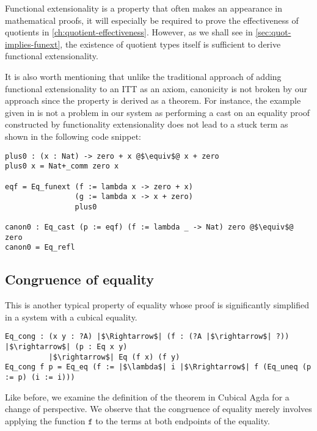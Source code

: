 \documentclass[12pt,twoside,maitrise]{dms}
\theoremstyle{definition}
\numberwithin{equation}{section}
\numberwithin{table}{chapter}
\numberwithin{figure}{chapter}
\newcommand\id[1] {\texttt{#1}}
\begin{document}
Functional extensionality is a property that often makes an appearance in
mathematical proofs, it will especially be required to prove the effectiveness
of quotients in \autoref{ch:quotient-effectiveness}. However, as we shall see in
\autoref{sec:quot-implies-funext}, the existence of quotient types itself is
sufficient to derive functional extensionality.

It is also worth mentioning that unlike the traditional approach of adding
functional extensionality to an ITT as an axiom, canonicity is not broken by our
approach since the property is derived as a theorem. For instance, the example
given in\cite{altenkirch2007observational} is not a problem in our system as
performing a cast on an equality proof constructed by functionality
extensionality does not lead to a stuck term as shown in the following code snippet:

\begin{verbatim}
plus0 : (x : Nat) -> zero + x @$\equiv$@ x + zero
plus0 x = Nat+_comm zero x

eqf = Eq_funext (f := lambda x -> zero + x)
                (g := lambda x -> x + zero)
                plus0

canon0 : Eq_cast (p := eqf) (f := lambda _ -> Nat) zero @$\equiv$@ zero
canon0 = Eq_refl
\end{verbatim}

\subsection*{Congruence of equality}\label{subsec:congruence-eq}
This is another typical property of equality whose proof is significantly
simplified in a system with a cubical equality.

\begin{verbatim}
Eq_cong : (x y : ?A) |$\Rightarrow$| (f : (?A |$\rightarrow$| ?)) |$\rightarrow$| (p : Eq x y)
          |$\rightarrow$| Eq (f x) (f y)
Eq_cong f p = Eq_eq (f := |$\lambda$| i |$\Rrightarrow$| f (Eq_uneq (p := p) (i := i)))
\end{verbatim}


Like before, we examine the definition of the theorem in Cubical Agda for a
change of perspective. We observe that the congruence of equality merely
involves applying the function $\id{f}$ to the terms at both endpoints of the
equality.
\end{document}
